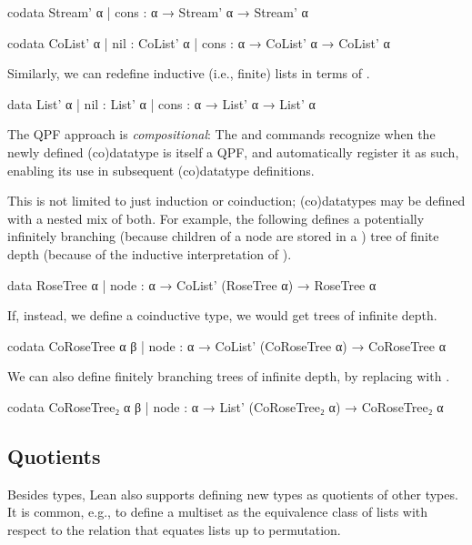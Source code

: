 \begin{leancode}
  codata Stream' α
    | cons : α → Stream' α → Stream' α 

  codata CoList' α 
    | nil  : CoList' α
    | cons : α → CoList' α → CoList' α
\end{leancode}

Similarly, we can redefine inductive (i.e., finite) lists in terms of \data{}.

\begin{leancode}
  data List' α 
    | nil  : List' α
    | cons : α → List' α → List' α
\end{leancode}


The QPF approach is \emph{compositional}:
The \data{} and \codata{} commands recognize when the newly defined (co)datatype is itself a QPF, and automatically register it as such, enabling its use in subsequent (co)datatype definitions.



This is not limited to just induction or coinduction; (co)datatypes may be defined with a nested mix of both.
For example, the following defines a potentially infinitely branching (because children of a node are stored in a ) tree of finite depth (because of the inductive interpretation of \data{}).

\begin{leancode}
  data RoseTree α
    | node : α → CoList' (RoseTree α) → RoseTree α
\end{leancode}

If, instead, we define a coinductive type, we would get trees of infinite depth.
\begin{leancode}
  codata CoRoseTree α β
    | node : α → CoList' (CoRoseTree α) → CoRoseTree α
\end{leancode}

We can also define finitely branching trees of infinite depth, by replacing  with .
\begin{leancode}
  codata CoRoseTree₂ α β
    | node : α → List' (CoRoseTree₂ α) → CoRoseTree₂ α
\end{leancode}


\subsection*{Quotients}
Besides \inductive{} types, Lean also supports defining new types as quotients of other types.
It is common, e.g., to define a multiset as the equivalence class of lists with respect to the relation that equates lists up to permutation.

